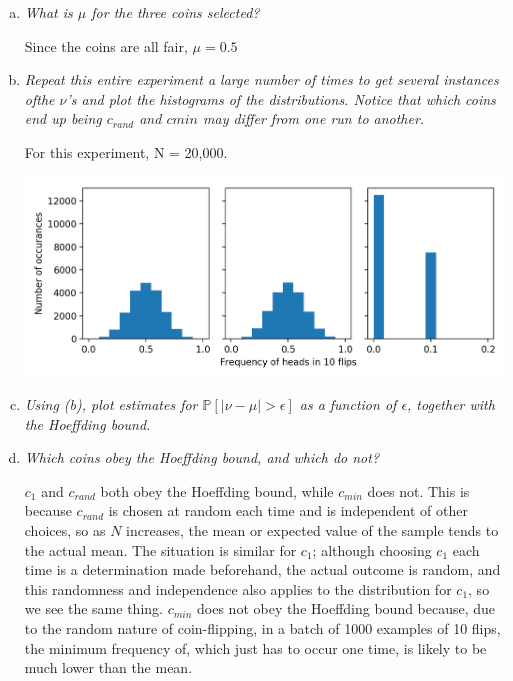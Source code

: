 \documentclass{article}
\begin{document}
\begin{enumerate}[(a)]
  \item \textit{What is $\mu$ for the three coins selected?}

    Since the coins are all fair, $\mu = 0.5$

  \item \textit{Repeat this entire experiment a large number of times to get several instances ofthe $\nu$'s and plot the histograms of the distributions. Notice that which coins end up being $c_{rand}$ and $c{min}$ may differ from one run to another.}

    For this experiment, N = 20,000.
    
    \includegraphics[width=\textwidth]{Figure_1.png}

  \item \textit{Using (b), plot estimates for $\mathbb{P}[|\nu - \mu| > \epsilon]$ as a function of $\epsilon$, together with the Hoeffding bound.}


  \item \textit{Which coins obey the Hoeffding bound, and which do not?}

    $c_1$ and $c_{rand}$ both obey the Hoeffding bound, while $c_{min}$ does not. This is because $c_{rand}$ is chosen at random each time and is independent of other choices, so as $N$ increases, the mean or expected value of the sample tends to the actual mean. The situation is similar for $c_1$; although choosing $c_1$ each time is a determination made beforehand, the actual outcome is random, and this randomness and independence also applies to the distribution for $c_1$, so we see the same thing. $c_{min}$ does not obey the Hoeffding bound because, due to the random nature of coin-flipping, in a batch of 1000 examples of 10 flips, the minimum frequency of, which just has to occur one time, is likely to be much lower than the mean.


\end{enumerate}
\end{document}
